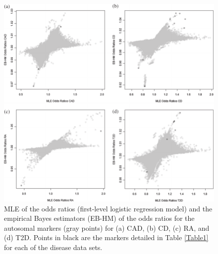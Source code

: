 \documentclass[oupdraft]{bio}
\begin{document}
\begin{figure}[!p]
\centering\includegraphics{fig4}
\caption{MLE of the odds ratios (first-level logistic
regression model) and the empirical Bayes estimators
(EB-HM) of the odds ratios for the autosomal markers
(gray points) for (a) CAD, (b) CD, (c) RA, and (d) T2D.
Points in black are the markers detailed in Table
\protect\ref{Table1} for each of the disease data sets.}
\label{Fig4}
\end{figure}
\end{document}
